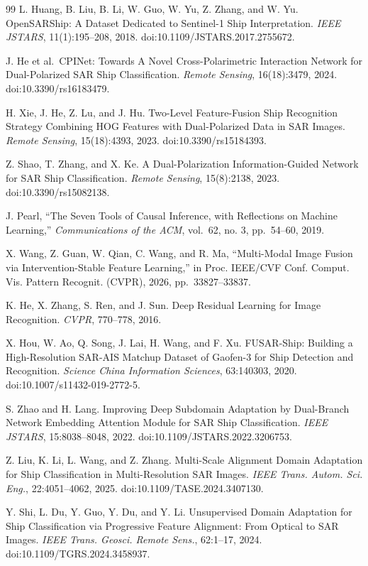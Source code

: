 \documentclass[journal,10pt,a4paper]{IEEEtran}
\begin{document}
\FloatBarrier
\balance
\begin{thebibliography}{99}
L. Huang, B. Liu, B. Li, W. Guo, W. Yu, Z. Zhang, and W. Yu. OpenSARShip: A Dataset Dedicated to Sentinel-1 Ship Interpretation. \emph{IEEE JSTARS}, 11(1):195--208, 2018. doi:10.1109/JSTARS.2017.2755672.

J. He et al.~CPINet: Towards A Novel Cross-Polarimetric Interaction Network for Dual-Polarized SAR Ship Classification. \emph{Remote Sensing}, 16(18):3479, 2024. doi:10.3390/rs16183479.

H. Xie, J. He, Z. Lu, and J. Hu. Two-Level Feature-Fusion Ship Recognition Strategy Combining HOG Features with Dual-Polarized Data in SAR Images. \emph{Remote Sensing}, 15(18):4393, 2023. doi:10.3390/rs15184393.

Z. Shao, T. Zhang, and X. Ke. A Dual-Polarization Information-Guided Network for SAR Ship Classification. \emph{Remote Sensing}, 15(8):2138, 2023. doi:10.3390/rs15082138.

J. Pearl, ``The Seven Tools of Causal Inference, with Reflections on Machine Learning,'' \emph{Communications of the ACM}, vol.~62, no. 3, pp.~54--60, 2019.

X. Wang, Z. Guan, W. Qian, C. Wang, and R. Ma, ``Multi-Modal Image Fusion via Intervention-Stable Feature Learning,'' in Proc. IEEE/CVF Conf. Comput. Vis. Pattern Recognit. (CVPR), 2026, pp.~33827--33837.

K. He, X. Zhang, S. Ren, and J. Sun. Deep Residual Learning for Image Recognition. \emph{CVPR}, 770--778, 2016.

X. Hou, W. Ao, Q. Song, J. Lai, H. Wang, and F. Xu. FUSAR-Ship: Building a High-Resolution SAR-AIS Matchup Dataset of Gaofen-3 for Ship Detection and Recognition. \emph{Science China Information Sciences}, 63:140303, 2020. doi:10.1007/s11432-019-2772-5.

S. Zhao and H. Lang. Improving Deep Subdomain Adaptation by Dual-Branch Network Embedding Attention Module for SAR Ship Classification. \emph{IEEE JSTARS}, 15:8038--8048, 2022. doi:10.1109/JSTARS.2022.3206753.

Z. Liu, K. Li, L. Wang, and Z. Zhang. Multi-Scale Alignment Domain Adaptation for Ship Classification in Multi-Resolution SAR Images. \emph{IEEE Trans. Autom. Sci. Eng.}, 22:4051--4062, 2025. doi:10.1109/TASE.2024.3407130.

Y. Shi, L. Du, Y. Guo, Y. Du, and Y. Li. Unsupervised Domain Adaptation for Ship Classification via Progressive Feature Alignment: From Optical to SAR Images. \emph{IEEE Trans. Geosci. Remote Sens.}, 62:1--17, 2024. doi:10.1109/TGRS.2024.3458937.


\end{thebibliography}
\end{document}
